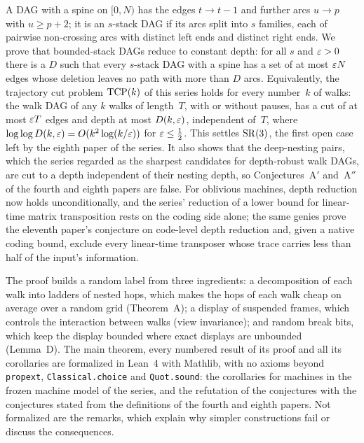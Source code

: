 A DAG with a spine on $[0,N)$ has the edges $t\to t-1$ and further arcs $u\to p$ with $u\ge p+2$; it is an $s$-stack DAG if
its arcs split into $s$ families, each of pairwise non-crossing arcs with distinct left ends and distinct right ends. We prove
that bounded-stack DAGs reduce to constant depth: for all $s$ and $\varepsilon>0$ there is a $D$ such that every $s$-stack DAG with a
spine has a set of at most $\varepsilon N$ edges whose deletion leaves no path with more than $D$ arcs. Equivalently, the trajectory
cut problem $\mathrm{TCP}(k)$ of this series holds for every number~$k$ of walks: the walk DAG of any $k$ walks of length~$T$, with or
without pauses, has a cut of at most $\varepsilon T$ edges and depth at most $D(k,\varepsilon)$, independent of~$T$, where
$\log\log D(k,\varepsilon)=O(k^2\log(k/\varepsilon))$ for $\varepsilon\le\frac12$. This settles $\mathrm{SR}(3)$, the first open case left by the eighth
paper of the series. It also shows that the deep-nesting pairs, which the series regarded as the sharpest candidates for
depth-robust walk DAGs, are cut to a depth independent of their nesting depth, so Conjectures~A$'$ and~A$''$ of the fourth and
eighth papers are false. For oblivious machines, depth reduction now holds unconditionally, and the series' reduction of a
lower bound for linear-time matrix transposition rests on the coding side alone; the same genies prove the eleventh paper's
conjecture on code-level depth reduction and, given a native coding bound, exclude every linear-time transposer whose trace
carries less than half of the input's information.

The proof builds a random label from three ingredients: a decomposition of each walk into ladders of nested hops, which makes
the hops of each walk cheap on average over a random grid (Theorem~A); a display of suspended frames, which controls the
interaction between walks (view invariance); and random break bits, which keep the display bounded where exact displays are
unbounded (Lemma~D). The main theorem, every numbered result of its proof and all its corollaries
are formalized in Lean~4 with Mathlib, with no axioms beyond \texttt{propext}, \texttt{Classical.choice} and
\texttt{Quot.sound}: the corollaries for machines in the frozen machine model of the series, and the refutation of the
conjectures with the conjectures stated from the definitions of the fourth and eighth papers. Not formalized are the remarks,
which explain why simpler constructions fail or discuss the consequences.
